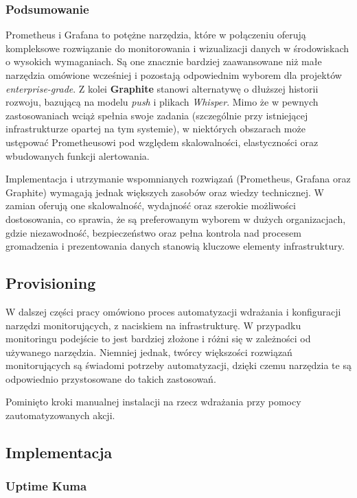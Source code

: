 \documentclass{article}
\begin{document}
\subsubsection{Podsumowanie}

Prometheus i Grafana to potężne narzędzia, które w połączeniu oferują kompleksowe rozwiązanie do monitorowania i wizualizacji danych w środowiskach o wysokich wymaganiach. Są one znacznie bardziej zaawansowane niż małe narzędzia omówione wcześniej i pozostają odpowiednim wyborem dla projektów \textit{enterprise-grade}. Z kolei \textbf{Graphite} stanowi alternatywę o dłuższej historii rozwoju, bazującą na modelu \emph{push} i plikach \emph{Whisper}. Mimo że w pewnych zastosowaniach wciąż spełnia swoje zadania (szczególnie przy istniejącej infrastrukturze opartej na tym systemie), w niektórych obszarach może ustępować Prometheusowi pod względem skalowalności, elastyczności oraz wbudowanych funkcji alertowania.

Implementacja i utrzymanie wspomnianych rozwiązań (Prometheus, Grafana oraz Graphite) wymagają jednak większych zasobów oraz wiedzy technicznej. W zamian oferują one skalowalność, wydajność oraz szerokie możliwości dostosowania, co sprawia, że są preferowanym wyborem w dużych organizacjach, gdzie niezawodność, bezpieczeństwo oraz pełna kontrola nad procesem gromadzenia i prezentowania danych stanowią kluczowe elementy infrastruktury.

\subsection{Provisioning}

W dalszej części pracy omówiono proces automatyzacji wdrażania i konfiguracji narzędzi monitorujących, z naciskiem na infrastrukturę. W przypadku monitoringu podejście to jest bardziej złożone i różni się w zależności od używanego narzędzia. Niemniej jednak, twórcy większości rozwiązań monitorujących są świadomi potrzeby automatyzacji, dzięki czemu narzędzia te są odpowiednio przystosowane do takich zastosowań.

Pominięto kroki manualnej instalacji na rzecz wdrażania przy pomocy zautomatyzowanych akcji.

\subsection{Implementacja}

\subsubsection{Uptime Kuma}
\end{document}
